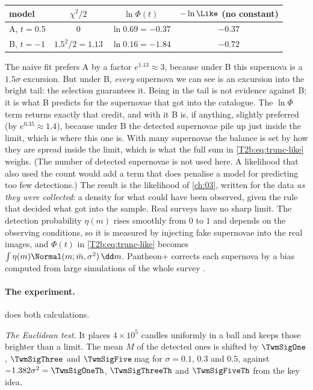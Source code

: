 \begin{center}
\small
\begin{tabular}{@{}lccc@{}}
\toprule
model & $\chi^2/2$ & $\ln\Phi(t)$ & $-\ln\Like$ (no constant)\\
\midrule
A, $t=0.5$ & $0$ & $\ln0.69=-0.37$ & $-0.37$\\
B, $t=-1$ & $1.5^2/2=1.13$ & $\ln0.16=-1.84$ & $-0.72$\\
\bottomrule
\end{tabular}
\end{center}
The naive fit prefers A by a factor $e^{1.13}\approx3$, because under B this supernova is a $1.5\sigma$ excursion. But under B, \emph{every} supernova we can see is an excursion into the bright tail: the selection guarantees it. Being in the tail is not evidence against B; it is what B predicts for the supernovae that got into the catalogue. The $\ln\Phi$ term returns exactly that credit, and with it B is, if anything, slightly preferred (by $e^{0.35}\approx1.4$), because under B the detected supernovae pile up just inside the limit, which is where this one is. With many supernovae the balance is set by how they are spread inside the limit, which is what the full sum in \eqref{T2b:eq:trunc-like} weighs. (The number of detected supernovae is not used here. A likelihood that also used the count would add a term that does penalise a model for predicting too few detections.) The result is the likelihood of \cref{ch:03}, written for the data \emph{as they were collected}: a density for what could have been observed, given the rule that decided what got into the sample. Real surveys have no sharp limit. The detection probability $\eta(m)$ rises smoothly from $0$ to $1$ and depends on the observing conditions, so it is measured by injecting fake supernovae into the real images, and $\Phi(t)$ in \eqref{T2b:eq:trunc-like} becomes $\int\eta(m)\Normal(m;\bar m,\sigma^2)\,\dd m$. Pantheon+ corrects each supernova by a bias computed from large simulations of the whole survey \cite{Brout2022PantheonPlus}.

\paragraph{The experiment.}  does both calculations.

\emph{The Euclidean test.} It places $4\times10^5$ candles uniformly in a ball and keeps those brighter than a limit. The mean $M$ of the detected ones is shifted by $\TwmSigOne$, $\TwmSigThree$ and $\TwmSigFive$\,mag for $\sigma=0.1$, $0.3$ and $0.5$, against $-1.382\sigma^2=\TwmSigOneTh$, $\TwmSigThreeTh$ and $\TwmSigFiveTh$ from the key idea.


